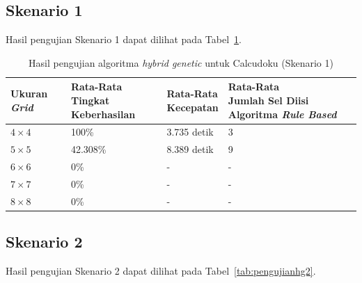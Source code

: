 \subsection{Skenario 1}
\label{sec:skenario1}

Hasil pengujian Skenario 1 dapat dilihat pada Tabel~\ref{tab:pengujianhg1}.

\begin{table}
\centering
\captionsetup{justification=centering}
\caption[Hasil pengujian algoritma \textit{hybrid genetic} untuk Calcudoku (Skenario 1)]{Hasil pengujian algoritma \textit{hybrid genetic} untuk Calcudoku (Skenario 1)}
\begin{tabular}{| l | l | l | l |}
\hline
Ukuran \textit{Grid} & \makecell[c]{Rata-Rata \\ Tingkat Keberhasilan} & \makecell[c]{Rata-Rata \\ Kecepatan} & \makecell[c]{Rata-Rata \\ Jumlah Sel Diisi Algoritma \textit{Rule Based}} \\
\hline \hline
\begin{math}4 \times 4\end{math} & 100\% & 3.735 detik & 3 \\
\hline
\begin{math}5 \times 5\end{math} & 42.308\% & 8.389 detik & 9 \\
\hline
\begin{math}6 \times 6\end{math} & 0\% & - & - \\
\hline
\begin{math}7 \times 7\end{math} & 0\% & - & - \\
\hline
\begin{math}8 \times 8\end{math} & 0\% & - & - \\
\hline
\end{tabular}
\label{tab:pengujianhg1}
\end{table}

\clearpage

\subsection{Skenario 2}
\label{sec:skenario2}

Hasil pengujian Skenario 2 dapat dilihat pada Tabel~\ref{tab:pengujianhg2}.

